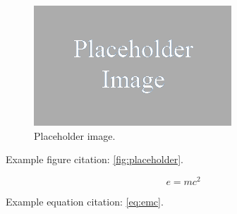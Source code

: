 \documentclass[paper=a4,twoside,captions=tableheading,index=totoc,hyperref]{labbook}
\begin{document}

\lipsum[4]

\begin{figure}[h!]
\raggedleft
\includegraphics[scale=0.5,keepaspectratio=true]{placeholder.png}
\caption{Placeholder image.}
\label{fig:placeholder}
\end{figure}

\lipsum[5]

Example figure citation: \autoref{fig:placeholder}.



\lipsum[6]



\lipsum[7]



\lipsum[8]



  
\lipsum[9]




\lipsum[10]

\begin{equation}
\label{eq:emc}
e = mc^2
\end{equation}

Example equation citation: \autoref{eq:emc}.


\end{document}
